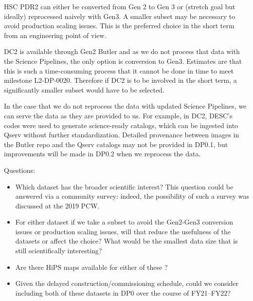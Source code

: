 HSC PDR2 can either be converted from Gen 2 to Gen 3 or (stretch goal but ideally) reprocessed naively with Gen3. A smaller subset may be necessary to avoid production scaling issues. This is the preferred choice in the short term from an engineering point of view.

DC2 is available through Gen2 Butler and as we do not process that data with the Science Pipelines, the only option is conversion to Gen3. Estimates are that this is such a time-consuming process that it cannot be done in time to meet milestone L2-DP-0020. Therefore if DC2 is to be involved in the short term, a significantly smaller subset would have to be selected.

In the case that we do not reprocess the data with updated Science Pipelines, we can serve the data as they are provided to us.
For example, in DC2, DESC's codes were used to generate science-ready catalogs, which can be ingested into Qserv without further standardization.
Detailed provenance between images in the Butler repo and the Qserv catalogs may not be provided in DP0.1, but improvements will be made in DP0.2 when we reprocess the data.

Questions:

\begin{itemize}

\item Which dataset has the broader scientific interest? This question could be answered via a community survey: indeed, the possibility of such a survey was discussed at the 2019 PCW.

\item For either dataset if we take a subset to avoid the Gen2-Gen3 conversion issues or production scaling issues, will that reduce the usefulness of the datasets or affect the choice? What would be the smallest data size that is still scientifically interesting?

\item Are there HiPS maps available for either of these ?


\item Given the delayed construction/commissioning schedule, could we consider including both of these datasets in DP0 over the course of FY21--FY22?

\end{itemize}

